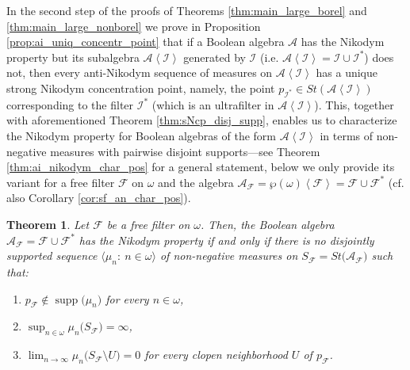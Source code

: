 \documentclass[a4paper,11pt,fleqn]{amsart}
\newtheorem{theoreml}{Theorem}[section]
\theoremstyle{definition}
\theoremstyle{remark}
\numberwithin{equation}{section}
\newcommand{\N}{\mathbb{N}}
\newcommand{\aA}{\mathcal{A}}
\newcommand{\fF}{\mathcal{F}}
\newcommand{\hH}{\mathcal{H}}
\newcommand{\iI}{\mathcal{I}}
\newcommand{\sm}{\setminus}
\DeclareMathOperator{\supp}{supp}
\newcommand{\seqn}[1]{\big\langle#1\colon\ n\io\big\rangle}
\newcommand{\gen}[1]{\mathopen{}\left\langle#1\mathclose{}\right\rangle}
\newcommand{\io}{\in\omega}%
\newcommand{\wo}{{\wp(\omega)}}%
\begin{document}
In the second step of the proofs of Theorems \ref{thm:main_large_borel} and \ref{thm:main_large_nonborel} we prove in Proposition \ref{prop:ai_uniq_concentr_point} that if a Boolean algebra $\aA$ has the Nikodym property but its subalgebra $\aA\gen{\iI}$ generated by $\iI$ (i.e. $\aA\gen{\iI}=\iI\cup\iI^*$) does not, then every anti-Nikodym sequence of measures on $\aA\gen{\iI}$ has a unique strong Nikodym concentration point, namely, the point $p_{\iI^*}\in St(\aA\gen{\iI})$ corresponding to the filter $\iI^*$ (which is an ultrafilter in $\aA\gen{\iI}$). %
This, together with aforementioned Theorem \ref{thm:sNcp_disj_supp}, enables us to characterize the Nikodym property for Boolean algebras of the form $\aA\gen{\iI}$ in terms of non-negative measures with pairwise disjoint supports---see Theorem \ref{thm:ai_nikodym_char_pos} for a general statement, below we only provide its variant for a free filter $\fF$ on $\omega$ and the algebra $\aA_\fF=\wo\gen{\fF}=\fF\cup\fF^*$ (cf. also Corollary \ref{cor:sf_an_char_pos}).

\begin{theoreml}\label{thm:main_sf_an_char_pos}
Let $\fF$ be a free filter on $\omega$. Then, the Boolean algebra $\aA_{\fF}=\fF\cup\fF^*$ has the Nikodym property if and only if there is no disjointly supported sequence $\seqn{\mu_n}$ of non-negative measures on $S_\fF=St\big(\aA_{\fF}\big)$ such that:
\begin{enumerate}
\item $p_{\fF}\not\in\supp\big(\mu_n\big)$ for every $n\io$,
\item $\sup_{n\in\omega}\mu_n\big(S_\fF\big)=\infty$,
\item $\lim_{n\to\infty}\mu_n\big(S_\fF\sm U\big)=0$ for every clopen neighborhood $U$ of $p_\fF$.
\end{enumerate}
\end{theoreml} 
\end{document}
